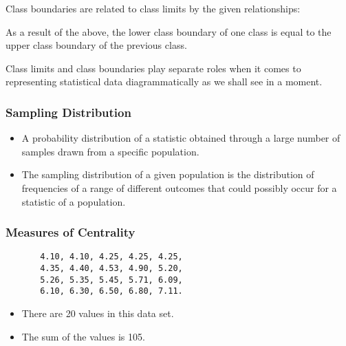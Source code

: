 \documentclass{beamer}
\begin{document}
\begin{frame}

Class boundaries are related to class limits by the given relationships:





As a result of the above, the lower class boundary of one class is equal to the upper class boundary of the previous class.

Class limits and class boundaries play separate roles when it comes to representing statistical data diagrammatically as we shall see in a moment.
\end{frame}
\begin{frame}
\frametitle{Sampling Distribution}
\begin{itemize}

\item A probability distribution of a statistic obtained through a large number of samples drawn from a specific population. 
\item The sampling distribution of a given population is the distribution of frequencies of a range of different outcomes 
that could possibly occur for a statistic of a population. 
\end{itemize}
\end{frame}

\begin{frame}[fragile]
\frametitle{Measures of Centrality}
\Large
\begin{center}
\begin{framed}

\begin{verbatim}
       4.10, 4.10, 4.25, 4.25, 4.25,  
       4.35, 4.40, 4.53, 4.90, 5.20, 
       5.26, 5.35, 5.45, 5.71, 6.09, 
       6.10, 6.30, 6.50, 6.80, 7.11.
\end{verbatim}

\end{framed}
\end{center}
\begin{itemize}
\item There are 20 values in this data set.
\item The sum of the values is 105.
\end{itemize}
\end{frame}
\end{document}
